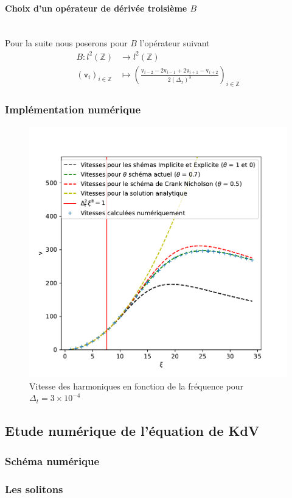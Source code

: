 \documentclass[12pt,a4paper]{article}
\numberwithin{equation}{section}
\begin{document}
\paragraph{Choix d'un opérateur de dérivée troisième $B$}\,\\

Pour la suite nous poserons pour $B$ l'opérateur suivant
\begin{align*}
        B : l^2(\mathbb{Z}) &\longrightarrow l^2(\mathbb{Z})\\
        (\texttt{v}_i)_{i\in\mathbb{Z}} &\mapsto \left(\frac{\texttt{v}_{i-2} - 2\texttt{v}_{i-1} + 2\texttt{v}_{i+1}-\texttt{v}_{i+2} }{2(\Delta_x)^3}\right)_{i\in\mathbb{Z}}
\end{align*}

\subsubsection{Implémentation numérique}

\begin{figure}[H]
    \centering
    \includegraphics[scale = 0.5]{graphs/v_xi en fonction de dt.pdf}
    \caption{Vitesse des harmoniques en fonction de la fréquence pour $\Delta_t = 3\times10^{-4}$}
    \label{fig:enter-label}
\end{figure}

\subsection{Etude numérique de l'équation de KdV}
\subsubsection{Schéma numérique}
\subsubsection{Les solitons}
\end{document}

